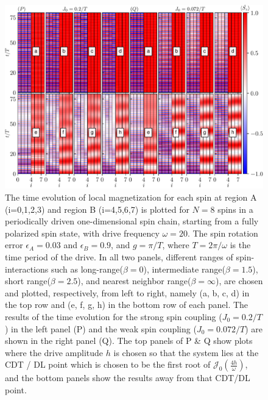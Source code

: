 \documentclass[12pt]{iopart}
\begin{document}
\begin{figure}[t!]
    \centering
    \hspace{2cm}\includegraphics[width=13.5cm]{figure4.pdf}
    \caption{The time evolution of local magnetization for each spin at region A (i=0,1,2,3) and region B (i=4,5,6,7) is plotted for $N=8$ spins in a periodically driven one-dimensional spin chain, starting from a fully polarized spin state, with drive frequency $\omega=20$. The spin rotation error $\epsilon_A = 0.03$ and $\epsilon_B = 0.9$, and $g=\pi/T$, where $T=2\pi/\omega$ is the time period of the drive.  In all two panels, different ranges of spin-interactions such as long-range($\beta=0$), intermediate range($\beta=1.5$), short range($\beta=2.5$), and nearest neighbor range($\beta=\infty$), are chosen and plotted, respectively, from left to right, namely (a, b, c, d) in the top row and (e, f, g, h) in the bottom row of each panel. The results of the time evolution for the strong spin coupling ($J_0 = 0.2/T$) in the left panel (P) and the weak spin coupling ($J_0 = 0.072/T$) are shown in the right panel (Q). The top panels of P \& Q show plots where the drive amplitude $h$ is chosen so that the system lies at the CDT / DL point which is chosen to be the first root of $\mathcal{J}_0\left(\frac{4h}{\omega}\right)$, and the bottom panels show the results away from that CDT/DL point.}
    \label{Fig:strong_weak_ea}
\end{figure}
\end{document}

